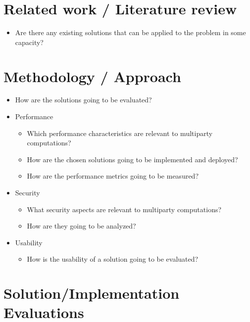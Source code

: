 \hypertarget{related-work-literature-review}{%
\section{Related work / Literature
review}\label{related-work-literature-review}}

\begin{itemize}
\tightlist
\item
  Are there any existing solutions that can be applied to the problem in
  some capacity?
\end{itemize}

\hypertarget{methodology-approach}{%
\section{Methodology / Approach}\label{methodology-approach}}

\begin{itemize}
\tightlist
\item
  How are the solutions going to be evaluated?
\item
  Performance

  \begin{itemize}
  \tightlist
  \item
    Which performance characteristics are relevant to multiparty
    computations?
  \item
    How are the chosen solutions going to be implemented and deployed?
  \item
    How are the performance metrics going to be measured?
  \end{itemize}
\item
  Security

  \begin{itemize}
  \tightlist
  \item
    What security aspects are relevant to multiparty computations?
  \item
    How are they going to be analyzed?
  \end{itemize}
\item
  Usability

  \begin{itemize}
  \tightlist
  \item
    How is the usability of a solution going to be evaluated?
  \end{itemize}
\end{itemize}

\hypertarget{solutionimplementation-evaluations}{%
\section{Solution/Implementation
Evaluations}\label{solutionimplementation-evaluations}}

